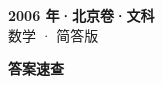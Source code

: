 \documentclass[zihao=-4, a4paper]{ctexart}
\begin{document}
\begin{center}
  {\Large\bfseries 2006 年·北京卷·文科}\\[4pt]
  {\large 数学 · 简答版}
\end{center}
\medskip
{}

\clearpage
{}
\begin{center}{\Large\bfseries 答案速查}\end{center}
\medskip

\end{document}
